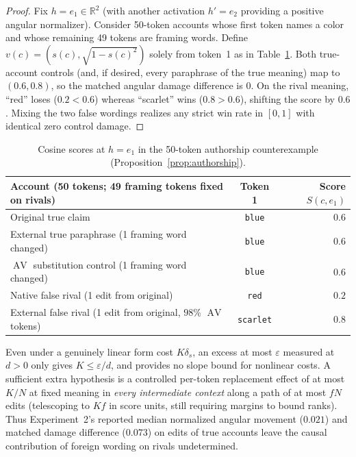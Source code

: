\documentclass[11pt]{article}
\theoremstyle{plain}
\theoremstyle{definition}
\theoremstyle{remark}
\DeclareMathOperator{\AV}{AV}
\begin{document}
\begin{proof}
Fix $h = e_1 \in \mathbb{R}^2$ (with another activation $h' = e_2$ providing a positive angular normalizer). Consider 50-token accounts whose first token names a color and whose remaining 49 tokens are framing words. Define $v(c) = (s(c), \sqrt{1 - s(c)^2})$ solely from token~1 as in Table~\ref{tab:red-scarlet}. Both true-account controls (and, if desired, every paraphrase of the true meaning) map to $(0.6, 0.8)$, so the matched angular damage difference is $0$. On the rival meaning, ``red'' loses ($0.2 < 0.6$) whereas ``scarlet'' wins ($0.8 > 0.6$), shifting the score by $0.6$. Mixing the two false wordings realizes any strict win rate in $[0, 1]$ with identical zero control damage.
\end{proof}

\begin{table}[ht]
\centering
\caption{Cosine scores at $h = e_1$ in the 50-token authorship counterexample (Proposition~\ref{prop:authorship}).}
\label{tab:red-scarlet}
\small
\begin{tabular}{@{}lcr@{}}
\toprule
Account (50 tokens; 49 framing tokens fixed on rivals) & Token 1 & Score $S(c, e_1)$ \\
\midrule
Original true claim & \texttt{blue} & $0.6$ \\
External true paraphrase (1 framing word changed) & \texttt{blue} & $0.6$ \\
$\AV$ substitution control (1 framing word changed) & \texttt{blue} & $0.6$ \\
Native false rival (1 edit from original) & \texttt{red} & $0.2$ \\
External false rival (1 edit from original, $98\%$ $\AV$ tokens) & \texttt{scarlet} & $0.8$ \\
\bottomrule
\end{tabular}
\end{table}

Even under a genuinely linear form cost $K\delta_s$, an excess at most $\varepsilon$ measured at $d > 0$ only gives $K \le \varepsilon/d$, and provides no slope bound for nonlinear costs. A sufficient extra hypothesis is a controlled per-token replacement effect of at most $K/N$ at fixed meaning in \emph{every intermediate context} along a path of at most $fN$ edits (telescoping to $Kf$ in score units, still requiring margins to bound ranks). Thus Experiment~2's reported median normalized angular movement ($0.021$) and matched damage difference ($0.073$) on edits of true accounts leave the causal contribution of foreign wording on rivals undetermined.
\end{document}
